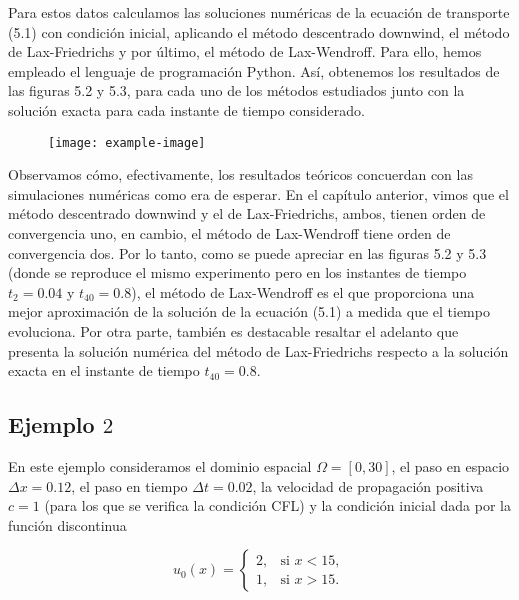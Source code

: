 Para estos datos calculamos las soluciones numéricas de la ecuación
de transporte (5.1) con condición inicial, aplicando el método
descentrado downwind, el método de Lax-Friedrichs y por último, el
método de Lax-Wendroff.
Para ello, hemos empleado el lenguaje de programación Python.
Así, obtenemos los resultados de las figuras 5.2 y 5.3, para cada uno
de los métodos estudiados junto con la solución exacta para cada
instante de tiempo considerado.

\begin{figure}[ht!]
    \centering
    \texttt{[image: example-image]}
\end{figure}

Observamos cómo, efectivamente, los resultados teóricos concuerdan
con las simulaciones numéricas como era de esperar.
En el capítulo anterior, vimos que el método descentrado downwind y
el de Lax-Friedrichs, ambos, tienen orden de convergencia uno, en
cambio, el método de Lax-Wendroff tiene orden de convergencia dos.
Por lo tanto, como se puede apreciar en las ﬁguras 5.2 y 5.3
(donde se reproduce el mismo experimento pero en los instantes de
tiempo $t_{2}=0.04$ y $t_{40}=0.8$), el método de Lax-Wendroff es el
que proporciona una mejor aproximación de la solución de la ecuación
(5.1) a medida que el tiempo evoluciona.
Por otra parte, también es destacable resaltar el adelanto que
presenta la solución numérica del método de Lax-Friedrichs respecto a
la solución exacta en el instante de tiempo $t_{40}=0.8$.

\subsection*{Ejemplo $2$}

En este ejemplo consideramos el dominio espacial
$\Omega=\left[0,30\right]$, el paso en espacio $\Delta x=0.12$, el
paso en tiempo $\Delta t=0.02$, la velocidad de propagación positiva
$c=1$ (para los que se veriﬁca la condición CFL) y la condición
inicial dada por la función discontinua

\begin{equation*}
    u_{0}\left(x\right)=
    \begin{cases}
        2, & \text{si }x<15, \\
        1, & \text{si }x>15.
    \end{cases}
\end{equation*}

